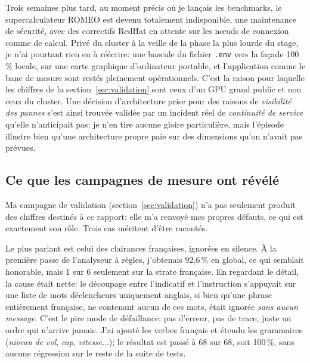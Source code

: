 \documentclass[11pt,a4paper]{article}
\begin{document}
Trois semaines plus tard, au moment précis où je lançais les benchmarks, le supercalculateur ROMEO est devenu totalement indisponible, une maintenance de sécurité, avec des correctifs RedHat en attente sur les n\oe uds de connexion comme de calcul. Privé du cluster à la veille de la phase la plus lourde du stage, je n'ai pourtant rien eu à réécrire: une bascule du fichier \texttt{.env} vers la façade 100\,\% locale, sur une carte graphique d'ordinateur portable, et l'application comme le banc de mesure sont restés pleinement opérationnels. C'est la raison pour laquelle les chiffres de la section~\ref{sec:validation} sont ceux d'un GPU grand public et non ceux du cluster. Une décision d'architecture prise pour des raisons de \emph{visibilité des pannes} s'est ainsi trouvée validée par un incident réel de \emph{continuité de service} qu'elle n'anticipait pas: je n'en tire aucune gloire particulière, mais l'épisode illustre bien qu'une architecture propre paie sur des dimensions qu'on n'avait pas prévues. 

\subsection{Ce que les campagnes de mesure ont révélé}

Ma campagne de validation (section~\ref{sec:validation}) n'a pas seulement produit des chiffres destinés à ce rapport: elle m'a renvoyé mes propres défauts, ce qui est exactement son rôle. Trois cas méritent d'être racontés.

Le plus parlant est celui des clairances françaises, ignorées en silence. À la première passe de l'analyseur à règles, j'obtenais 92,6\,\% en global, ce qui semblait honorable, mais 1 sur 6 seulement sur la strate française. En regardant le détail, la cause était nette: le découpage entre l'indicatif et l'instruction s'appuyait sur une liste de mots déclencheurs uniquement anglais, si bien qu'une phrase entièrement française, ne contenant aucun de ces mots, était ignorée \emph{sans aucun message}. C'est le pire mode de défaillance: pas d'erreur, pas de trace, juste un ordre qui n'arrive jamais. J'ai ajouté les verbes français et étendu les grammaires (\emph{niveau de vol}, \emph{cap}, \emph{vitesse}...); le résultat est passé à 68 sur 68, soit 100\,\%, sans aucune régression sur le reste de la suite de tests. 
\end{document}
